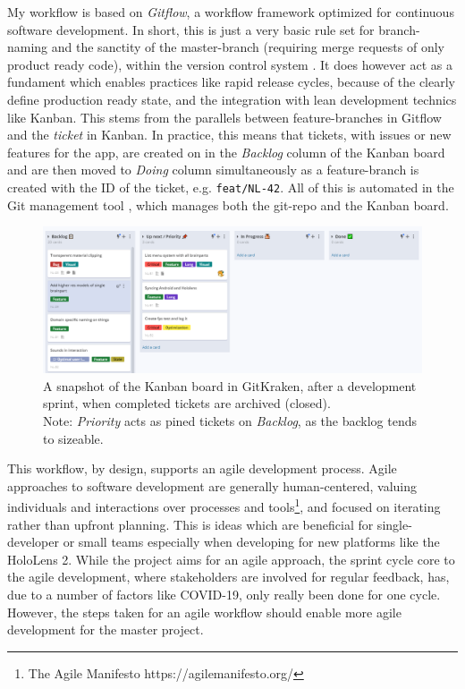 My workflow is based on \textit{Gitflow}, a workflow framework optimized for continuous software development. In short, this is just a very basic rule set for branch-naming and the sanctity of the master-branch (requiring merge requests of only product ready code), within the version control system . It does however act as a fundament which enables practices like rapid release cycles, because of the clearly define production ready state, and the integration with lean development technics like Kanban. This stems from the parallels between feature-branches in Gitflow and the \textit{ticket} in Kanban. In practice, this means that tickets, with issues or new features for the app, are created on in the \textit{Backlog} column of the Kanban board and are then moved to \textit{Doing} column simultaneously as a feature-branch is created with the ID of the ticket, e.g. \texttt{feat/NL-42}. All of this is automated in the Git management tool , which manages both the git-repo and the Kanban board.

\begin{figure}[h]
    \includegraphics[width=\textwidth]{fig/kanban2}
    \caption{A snapshot of the Kanban board in GitKraken, after a development sprint, when completed tickets are archived (closed).\\ Note: \textit{Priority} acts as pined tickets on \textit{Backlog}, as the backlog tends to sizeable.}
    \label{fig:kanban}
\end{figure}

This workflow, by design, supports an agile development process. Agile approaches to software development are generally human-centered, valuing individuals and interactions over processes and tools\footnote{The Agile Manifesto https://agilemanifesto.org/}, and focused on iterating rather than upfront planning. This is ideas which are beneficial for single-developer or small teams especially when developing for new platforms like the HoloLens 2. 
While the project aims for an agile approach, the sprint cycle core to the agile development, where stakeholders are involved for regular feedback, has, due to a number of factors like COVID-19, only really been done for one cycle. However, the steps taken for an agile workflow should enable more agile development for the master project.

